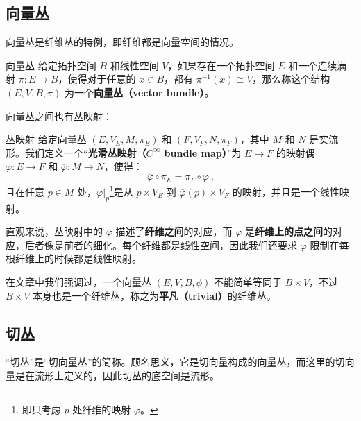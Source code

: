 \begin{issues}
\issueDraft
\end{issues}


\subsection{向量丛}


向量丛是纤维丛的特例，即纤维都是向量空间的情况。

\begin{definition}{向量丛}
给定拓扑空间 $B$ 和线性空间 $V$，如果存在一个拓扑空间 $E$ 和一个连续满射 $\pi:E\rightarrow B$，使得对于任意的 $x\in B$，都有 $\pi^{-1}(x)\cong V$，那么称这个结构 $(E, V, B, \pi)$ 为一个\textbf{向量丛（vector bundle）}。
\end{definition}

向量丛之间也有丛映射：

\begin{definition}{丛映射}
给定向量丛 $(E, V_E, M, \pi_E)$ 和 $(F, V_F, N, \pi_F)$，其中 $M$ 和 $N$ 是实流形。我们定义一个“\textbf{光滑丛映射（$C^\infty$ bundle map）}”为 $E\rightarrow F$ 的映射偶 $\varphi: E\rightarrow F$ 和 $\overline{\varphi}: M\rightarrow N$，使得：
\begin{equation}
\overline{\varphi}\circ\pi_E=\pi_F\circ\varphi~.
\end{equation}
且在任意 $p\in M$ 处，$\varphi|_p$\footnote{即只考虑 $p$ 处纤维的映射 $\varphi$。}是从 $p\times V_E$ 到 $\overline{\varphi}(p)\times V_F$ 的映射，并且是一个线性映射。
\end{definition}

直观来说，丛映射中的 $\overline{\varphi}$ 描述了\textbf{纤维之间}的对应，而 $\varphi$ 是\textbf{纤维上的点之间}的对应，后者像是前者的细化。每个纤维都是线性空间，因此我们还要求 $\varphi$ 限制在每根纤维上的时候都是线性映射。

在文章中我们强调过，一个向量丛 $(E, V, B, \phi)$ 不能简单等同于 $B\times V$，不过 $B\times V$ 本身也是一个纤维丛，称之为\textbf{平凡（trivial）}的纤维丛。




\subsection{切丛}
“切丛”是“切向量丛”的简称。顾名思义，它是切向量构成的向量丛，而这里的切向量是在流形上定义的，因此切丛的底空间是流形。

